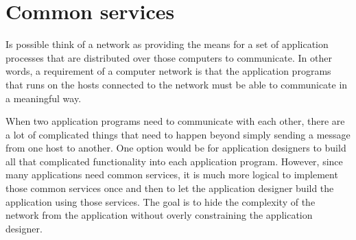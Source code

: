 \section{Common services}

Is possible think of a network as providing the means for a set of application
processes that are distributed over those computers to communicate. In other
words, a requirement of a computer network is that the application
programs that runs on the hosts connected to the network must be able to
communicate in a meaningful way.

When two application programs need to communicate with each other, there
are a lot of complicated things that need to happen beyond simply sending a
message from one host to another. One option would be for application
designers to build all that complicated functionality into each application
program. However, since many applications need common services, it is much
more logical to implement those common services once and then to let the
application designer build the application using those services. 
The goal is to hide the complexity of the network from the application without
overly constraining the application 
designer. \cite[pp. 15]{PetersonDavie:2003} 


